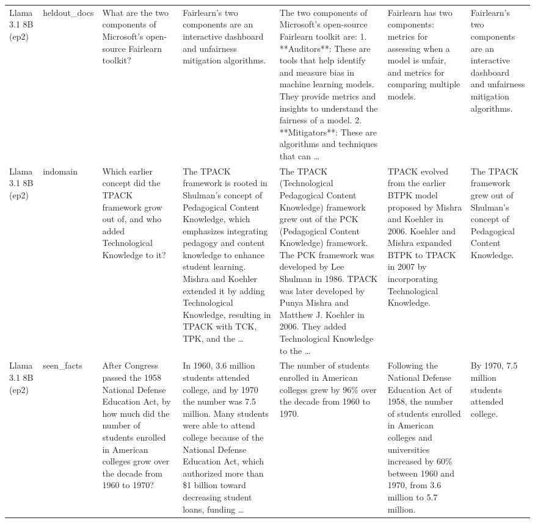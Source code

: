 \begin{table}[t]
\begin{tabular}{p{1.6cm}p{1cm}p{2.4cm}p{2.6cm}p{3.2cm}p{3.2cm}p{2.4cm}}
Llama 3.1 8B (ep2) & heldout\_docs & What are the two components of Microsoft's open-source Fairlearn toolkit? & Fairlearn's two components are an interactive dashboard and unfairness mitigation algorithms. & The two components of Microsoft's open-source Fairlearn toolkit are: 1. **Auditors**: These are tools that help identify and measure bias in machine learning models. They provide metrics and insights to understand the fairness of a model. 2. **Mitigators**: These are algorithms and techniques that can … & Fairlearn has two components: metrics for assessing when a model is unfair, and metrics for comparing multiple models. & Fairlearn's two components are an interactive dashboard and unfairness mitigation algorithms. \\
Llama 3.1 8B (ep2) & indomain & Which earlier concept did the TPACK framework grow out of, and who added Technological Knowledge to it? & The TPACK framework is rooted in Shulman's concept of Pedagogical Content Knowledge, which emphasizes integrating pedagogy and content knowledge to enhance student learning. Mishra and Koehler extended it by adding Technological Knowledge, resulting in TPACK with TCK, TPK, and the … & The TPACK (Technological Pedagogical Content Knowledge) framework grew out of the PCK (Pedagogical Content Knowledge) framework. The PCK framework was developed by Lee Shulman in 1986. TPACK was later developed by Punya Mishra and Matthew J. Koehler in 2006. They added Technological Knowledge to the … & TPACK evolved from the earlier BTPK model proposed by Mishra and Koehler in 2006. Koehler and Mishra expanded BTPK to TPACK in 2007 by incorporating Technological Knowledge. & The TPACK framework grew out of Shulman's concept of Pedagogical Content Knowledge. \\
Llama 3.1 8B (ep2) & seen\_facts & After Congress passed the 1958 National Defense Education Act, by how much did the number of students enrolled in American colleges grow over the decade from 1960 to 1970? & In 1960, 3.6 million students attended college, and by 1970 the number was 7.5 million. Many students were able to attend college because of the National Defense Education Act, which authorized more than \$1 billion toward decreasing student loans, funding … & The number of students enrolled in American colleges grew by 96\% over the decade from 1960 to 1970. & Following the National Defense Education Act of 1958, the number of students enrolled in American colleges and universities increased by 60\% between 1960 and 1970, from 3.6 million to 5.7 million. & By 1970, 7.5 million students attended college. \\

\end{tabular}
\end{table}
